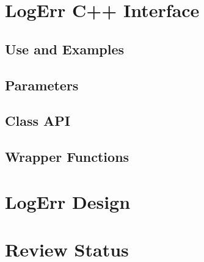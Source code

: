 \documentclass[]{article}
\begin{document}
\section{LogErr C++ Interface}
\subsection{Use and Examples}

\subsection{Parameters}

\subsection{Class API}

\subsection{Wrapper Functions}

\section{LogErr Design}
\section{Review Status}




\end{document}
